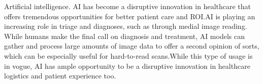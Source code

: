 \documentclass[12pt]{article}
\begin{document}
\indent

Artificial intelligence. AI has become a disruptive innovation in healthcare that offers tremendous opportunities for better patient care and ROI.AI is playing an increasing role in triage and diagnoses, such as through medial image reading. While humans make the final call on diagnosis and treatment, AI models can gather and process large amounts of image data to offer a second opinion of sorts, which can be especially useful for hard-to-read scans.While this type of usage is in vogue, AI has ample opportunity to be a disruptive innovation in healthcare logistics and patient experience too.
\end{document}

